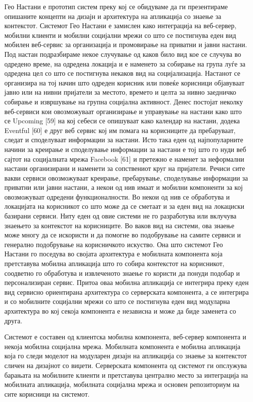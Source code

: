 Гео Настани е прототип систем преку кој се обидуваме да ги презентираме
опишаните концепти на дизајн и архитектура на апликација со знаење за
контекстот. Системот Гео Настани е замислен како интеграција на веб-сервер,
мобилни клиенти и мобилни социјални мрежи со што се постигнува еден вид мобилен
веб-сервис за организација и промовирање на приватни и јавни настани. Под настан
подразбираме некое случување од каков било вид кое се случува во одредено време,
на одредена локација и е наменето за собирање на група луѓе за одредена цел со
што се постигнува некаков вид на социјализација. Настанот се организира на тој
начин што одреден корисник или повеќе корисници објавуваат јавно или на нивни
пријатели за местото, времето и целта за нивно заедничко собирање и извршување
на групна социјална активност. Денес постојат неколку веб-сервиси кои
овозможуваат организирање и управување на настани како што се Upcoming [59] на
кој себеси се опишуваат како календар на настани, додека Eventful [60] е друг
веб сервис кој им помага на корисниците да пребаруваат, следат и споделуваат
информации за настани. Исто така еден од најпопуларните начини за креирање и
споделување информации за настани е тој што го нуди веб сајтот на социјалната
мрежа Facebook [61] и претежно е наменет за неформални настани организирани и
наменети за сопствениот круг на пријатели. Речиси сите вакви сервиси
овозможуваат креирање, пребарување, споделување информации за приватни или јавни
настани, а некои од нив имаат и мобилни компоненти за кој овозможуваат одредени
функционалности. Во некои од нив се обработува и локацијата на корисникот со што
може да се сметаат и за еден вид на локациски базирани сервиси. Ниту еден од
овие системи не го разработува или вклучува знаењето за контекстот на
корисниците. Во ваков вид на системи, ова знаење може многу да се искористи и да
помогне во подобрување на самите сервиси и генерално подобрување на корисничкото
искуство. Она што системот Гео Настани го поседува во својата архитектура е
мобилната компонента која претставува мобилна апликација што го собира
контекстот на корисникот, соодветно го обработува и извлеченото знаење го
користи да понуди подобар и персонализиран сервис. Притоа оваа мобилна
апликација се интегрира преку еден вид сервисно ориентирана архитектура со
серверската компонента, а се интегрира и со мобилните социјални мрежи со што се
постигнува еден вид модуларна архитектура во кој секоја компонента е независна и
може да биде заменета со друга.

Системот е составен од клиентска мобилна компонента, веб-сервер компонента и
некоја мобилна социјална мрежа. Мобилната компонента е мобилна апликација која
го следи моделот на модуларен дизајн на апликација со знаење за контекстот
сличен на дизајнот со виџети. Серверската компонента од системот ги опслужува
барањата на мобилните клиенти и претставува централно место за интеграција на
мобилната апликација, мобилната социјална мрежа и основен репозиториум на сите
корисници на системот.

